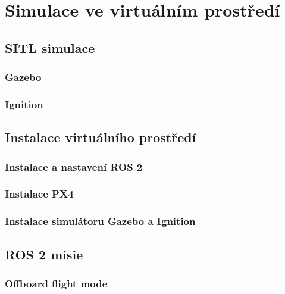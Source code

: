 \chapter{Simulace ve virtuálním prostředí}

\section{SITL simulace}

\subsection{Gazebo}

\subsection{Ignition}

\section{Instalace virtuálního prostředí}

\subsection{Instalace a nastavení ROS 2}

\subsection{Instalace PX4}

\subsection{Instalace simulátoru Gazebo a Ignition}

\section{ROS 2 misie}

\subsection{Offboard flight mode}



